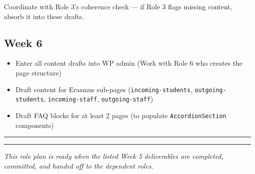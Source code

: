 \documentclass[11pt,a4paper]{article}
\newcommand{\grouprule}{\vspace{0.3em}\textcolor{ruleLine}{\rule{\linewidth}{0.4pt}}\vspace{0.3em}}
\begin{document}
Coordinate with Role 3's coherence check — if Role 3 flags missing content, absorb it into these drafts.

\subsection{Week 6}

\begin{itemize}
\item Enter all content drafts into WP admin (Work with Role 6 who creates the page structure)
\item Draft content for Erasmus sub-pages (\nolinkurl{incoming-students}, \nolinkurl{outgoing-students}, \nolinkurl{incoming-staff}, \nolinkurl{outgoing-staff})
\item Draft FAQ blocks for at least 2 pages (to populate \nolinkurl{AccordionSection} components)
\end{itemize}

\grouprule
\vspace{1.2em}
\textcolor{uvtYellow}{\rule{\linewidth}{1.5pt}}

{\small\textit{This role plan is ready when the listed Week 5 deliverables are completed, committed, and handed off to the dependent roles.}}
\end{document}
